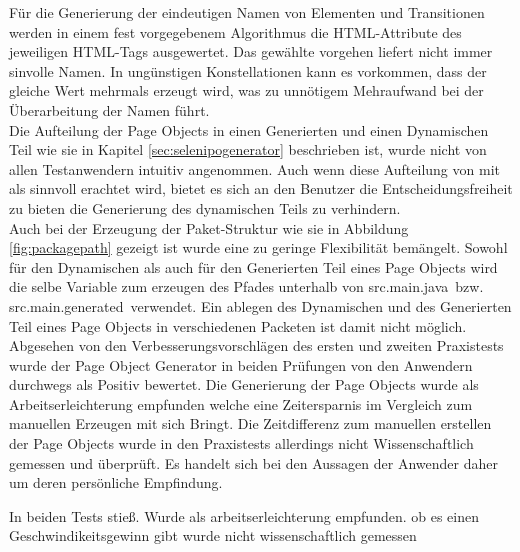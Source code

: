 Für die Generierung der eindeutigen Namen von Elementen und Transitionen werden in einem fest vorgegebenem Algorithmus die HTML-Attribute des jeweiligen HTML-Tags ausgewertet. Das gewählte vorgehen liefert nicht immer sinvolle Namen. In ungünstigen Konstellationen kann es vorkommen, dass der gleiche Wert mehrmals erzeugt wird, was zu unnötigem Mehraufwand bei der Überarbeitung der Namen führt.\\
Die Aufteilung der Page Objects in einen Generierten und einen Dynamischen Teil wie sie in Kapitel \ref{sec:selenipogenerator} beschrieben ist, wurde nicht von allen Testanwendern intuitiv angenommen.
Auch wenn diese Aufteilung von mit als sinnvoll erachtet wird, bietet es sich an den Benutzer die Entscheidungsfreiheit zu bieten die Generierung des dynamischen Teils zu verhindern.\\
Auch bei der Erzeugung der Paket-Struktur wie sie in Abbildung \ref{fig:packagepath} gezeigt ist wurde eine zu geringe Flexibilität bemängelt.
Sowohl für den Dynamischen als auch für den Generierten Teil eines Page Objects wird die selbe Variable zum erzeugen des Pfades unterhalb von \grq src.main.java\grq\ bzw. \grq src.main.generated\grq\ verwendet. Ein ablegen des Dynamischen und des Generierten Teil eines Page Objects in verschiedenen Packeten ist damit nicht möglich.\\
Abgesehen von den Verbesserungsvorschlägen des ersten und zweiten Praxistests wurde der Page Object Generator in beiden Prüfungen von den Anwendern durchwegs als Positiv bewertet. Die Generierung der Page Objects wurde als Arbeitserleichterung empfunden welche eine Zeitersparnis im Vergleich zum manuellen Erzeugen mit sich Bringt. Die Zeitdifferenz zum manuellen erstellen der Page Objects wurde in den Praxistests allerdings nicht Wissenschaftlich gemessen und überprüft. Es handelt sich bei den Aussagen der Anwender daher um deren persönliche Empfindung.

In beiden Tests stieß. Wurde als arbeitserleichterung empfunden. ob es einen Geschwindikeitsgewinn gibt wurde nicht wissenschaftlich gemessen

